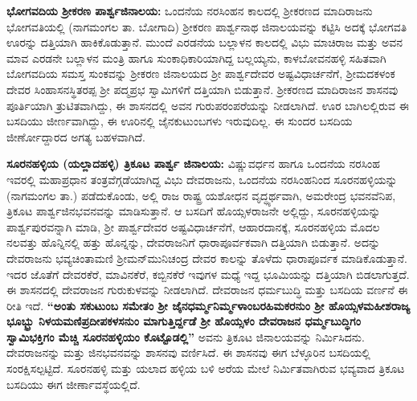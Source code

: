 \textbf{ಭೋಗವದಿಯ ಶ‍್ರೀಕರಣ ಪಾರ್ಶ್ವಜಿನಾಲಯ: } ಒಂದನೆಯ ನರಸಿಂಹನ ಕಾಲದಲ್ಲಿ ಶ‍್ರೀಕರಣದ ಮಾದಿರಾಜನು ಭೋಗವತಿಯಲ್ಲಿ (ನಾಗಮಂಗಲ ತಾ. ಬೋಗಾದಿ) ಶ‍್ರೀಕರಣ ಪಾರ್ಶ್ವನಾಥ ಜಿನಾಲಯವನ್ನು ಕಟ್ಟಿಸಿ ಅದಕ್ಕೆ ಭೋಗವತಿ ಊರನ್ನು ದತ್ತಿಯಾಗಿ ಹಾಕಿಕೊಡುತ್ತಾನೆ. ಮುಂದೆ ಎರಡನೆಯ ಬಲ್ಲಾಳನ ಕಾಲದಲ್ಲಿ ವಿಭು ಮಾಚಿರಾಜ ಮತ್ತು ಅವನ ಮಾವ ಎರಡನೇ ಬಲ್ಲಾಳನ ಮಂತ್ರಿ ಹಾಗೂ ಸುಂಕಾಧಿಕಾರಿಯಾಗಿದ್ದ ಬಲ್ಲಯ್ಯನು, ಕಾಳಬೋವನಹಳ್ಳಿ ಸಹಿತವಾಗಿ ಬೋಗವದಿಯ ಸಮಸ್ತ ಸುಂಕವನ್ನು ಶ‍್ರೀಕರಣ ಜಿನಾಲಯದ ಶ‍್ರೀ ಪಾರ್ಶ್ವದೇವರ ಅಷ್ಟವಿಧಾರ್ಚನೆಗೆ, ಶ‍್ರೀಮದಕಳಂಕ ದೇವರ ಸಿಂಹಾಸನಸ್ಥಿತರಪ್ಪ ಶ‍್ರೀ ಪದ್ಮಪ್ರಭ ಸ್ವಾಮಿಗಳಿಗೆ ದತ್ತಿಯಾಗಿ ಬಿಡುತ್ತಾನೆ. ಶ‍್ರೀಕರಣದ ಮಾದಿರಾಜನ ಶಾಸನವು ಪೂರ್ತಿಯಾಗಿ ತ್ರುಟಿತವಾಗಿದ್ದು, ಈ ಶಾಸನದಲ್ಲಿ ಅವನ ಗುರುಪರಂಪರೆಯನ್ನು ನೀಡಲಾಗಿದೆ. ಊರ ಬಾಗಿಲಲ್ಲಿರುವ ಈ ಬಸದಿಯು ಜೀರ್ಣವಾಗಿದ್ದು, ಈ ಊರಿನಲ್ಲಿ ಜೈನಕುಟುಂಬಗಳು ಇರುವುದಿಲ್ಲ. ಈ ಸುಂದರ ಬಸದಿಯ ಜೀರ್ಣೋದ್ದಾರದ ಅಗತ್ಯ ಬಹಳವಾಗಿದೆ.

\textbf{ಸೂರನಹಳ್ಳಿಯ (ಯಲ್ಲಾದಹಳ್ಳಿ) ತ್ರಿಕೂಟ ಪಾರ್ಶ್ವ ಜಿನಾಲಯ:} ವಿಷ್ಣುವರ್ಧನ ಹಾಗೂ ಒಂದನೆಯ ನರಸಿಂಹ ಇವರಲ್ಲಿ ಮಹಾಪ್ರಧಾನ ತಂತ್ರವೆಗ್ಗಡೆಯಾಗಿದ್ದ ವಿಭು ದೇವರಾಜನು, ಒಂದನೆಯ ನರಸಿಂಹನಿಂದ ಸೂರನಹಳ್ಳಿಯನ್ನು (ನಾಗಮಂಗಲ ತಾ.) ಪಡೆದುಕೊಂಡು, ಅಲ್ಲಿ ರಾಜ ರಾಷ್ಟ್ರ ಯಶೋಧನ ವೃದ್ಧ್ಯರ್ಥವಾಗಿ, ಅಮರೇಂದ್ರ ಭವನವೆನಿಪ, ತ್ರಿಕೂಟ ಪಾರ್ಶ್ವಜಿನಭವನ\-ವನ್ನು ಮಾಡಿಸುತ್ತಾನೆ. ಆ ಬಸದಿಗೆ ಹೊಯ್ಸಳರಾಜನೇ ಅಲ್ಲಿದ್ದು, ಸೂರನಹಳ್ಳಿಯನ್ನು ಪಾರ್ಶ್ವಪುರವನ್ನಾಗಿ ಮಾಡಿ, ಶ‍್ರೀ ಪಾರ್ಶ್ವದೇವರ ಅಷ್ಟವಿಧಾರ್ಚನೆಗೆ, ಆಹಾರದಾನಕ್ಕೆ, ಸೂರನಹಳ್ಳಿಯ ಮೊದಲ ನಲವತ್ತು ಹೊನ್ನಿನಲ್ಲಿ ಹತ್ತು ಹೊನ್ನನ್ನು, ದೇವರಾಜನಿಗೆ ಧಾರಾಪೂರ್ವಕವಾಗಿ ದತ್ತಿಯಾಗಿ ಬಿಡುತ್ತಾನೆ. ಅದನ್ನು ದೇವರಾಜನು ಭವ್ಯಚಿಂತಾಮಣಿ ಶ‍್ರೀಮನ್​ಮುನಿಚಂದ್ರ ದೇವರ ಕಾಲನ್ನು ತೊಳೆದು ಧಾರಾಪೂರ್ವಕ ಮಾಡಿಕೊಡುತ್ತಾನೆ. ಇದರ ಜೊತೆಗೆ ದೇವರಕೆರೆ, ಮಾವಿನಕೆರೆ, ಕಬ್ಬಿನಕೆರೆ ಇವುಗಳ ಮಧ್ಯೆ ಇದ್ದ ಭೂಮಿಯನ್ನು ದತ್ತಿಯಾಗಿ ಬಿಡಲಾಗುತ್ತದೆ. ಈ ಶಾಸನದಲ್ಲಿ ದೇವರಾಜನ ಗುರುಕುಳವನ್ನು ನೀಡಲಾಗಿದೆ. ದೇವರಾಜನ ಧರ್ಮಬುದ್ಧಿ ಮತ್ತು ಬಸದಿಯ ವರ್ಣನೆ ಈ ರೀತಿ ಇದೆ. \textbf{“ಅಂತು \hbox{ಸಕುಟುಂಬ} ಸಮೇತಂ ಶ‍್ರೀ ಜೈನಧರ್ಮ್ಮನಿರ್ಮ್ಮಳಾಂಬರಹಿಮಕರನುಂ ಶ‍್ರೀ ಹೊಯ್ಸಳಮಹೀಶರಾಜ್ಯ ಭೂಭ್ಭ್ರು ನಿಳಯಮಣಿಪ್ರದೀಪಕಳಸನುಂ ಮಾಗುತ್ತಿರ್ದ್ದಡೆ ಶ‍್ರೀ ಹೊಯ್ಸಳಂ ದೇವರಾಜನ ಧರ್ಮ್ಮಬುದ್ಧಿಗಂ ಸ್ವಾಮಿಭಕ್ತಿಗಂ ಮೆಚ್ಚಿ ಸೂರನಹಳ್ಳಿಯಂ ಕೊಟ್ಟೊಡಲ್ಲಿ” }ಅವನು ತ್ರಿಕೂಟ ಜಿನಾಲಯವನ್ನು ನಿರ್ಮಿಸಿದನು. ದೇವರಾಜನನ್ನು ಮತ್ತು ಜಿನಭವನವನ್ನು ಶಾಸನವು ವರ್ಣಿಸಿದೆ. ಈ ಶಾಸನವು ಈಗ ಬೆಳ್ಳೂರಿನ ಬಸದಿಯಲ್ಲಿ ಸಂರಕ್ಷಿಸಲ್ಪಟ್ಟಿದೆ. ಸೂರನಹಳ್ಳಿ ಮತ್ತು ಯಲಾದ ಹಳ್ಳಿಯ ಬಳಿ ಅರೆಯ ಮೇಲೆ ನಿರ್ಮಿತವಾಗಿರುವ ಭವ್ಯವಾದ ತ್ರಿಕೂಟ ಬಸದಿಯು ಈಗ ಜೀರ್ಣಾವಸ್ಥೆಯಲ್ಲಿದೆ.


